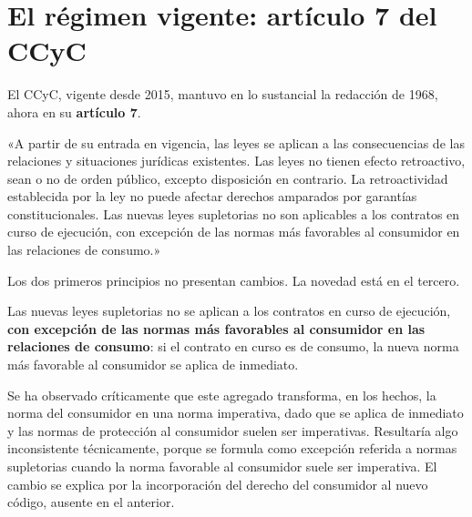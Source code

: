 \documentclass[12pt,oneside]{book}
\begin{document}
\section{El régimen vigente: artículo 7 del CCyC}

El CCyC, vigente desde 2015, mantuvo en lo sustancial la redacción de 1968, ahora en su \textbf{artículo 7}.

\begin{regla}
«A partir de su entrada en vigencia, las leyes se aplican a las consecuencias de las relaciones y situaciones jurídicas existentes. Las leyes no tienen efecto retroactivo, sean o no de orden público, excepto disposición en contrario. La retroactividad establecida por la ley no puede afectar derechos amparados por garantías constitucionales. Las nuevas leyes supletorias no son aplicables a los contratos en curso de ejecución, con excepción de las normas más favorables al consumidor en las relaciones de consumo.»
\end{regla}

Los dos primeros principios no presentan cambios. La novedad está en el tercero.

\begin{importante}
Las nuevas leyes supletorias no se aplican a los contratos en curso de ejecución, \textbf{con excepción de las normas más favorables al consumidor en las relaciones de consumo}: si el contrato en curso es de consumo, la nueva norma más favorable al consumidor se aplica de inmediato.
\end{importante}

\begin{nota}
Se ha observado críticamente que este agregado transforma, en los hechos, la norma del consumidor en una norma imperativa, dado que se aplica de inmediato y las normas de protección al consumidor suelen ser imperativas. Resultaría algo inconsistente técnicamente, porque se formula como excepción referida a normas supletorias cuando la norma favorable al consumidor suele ser imperativa. El cambio se explica por la incorporación del derecho del consumidor al nuevo código, ausente en el anterior.
\end{nota}
\end{document}
